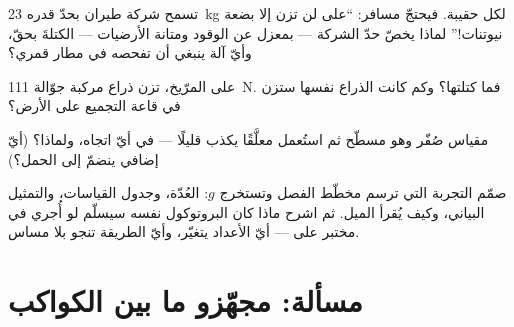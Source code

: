 \begin{exercise}[$\star\star$]\label{exo:g9:weight-vs-mass:9}
تسمح شركة طيران بحدّ قدره \qty{23}{kg} لكل حقيبة. فيحتجّ مسافر: ``على
 لن تزن إلا بضعة نيوتنات!'' لماذا يخصّ حدّ الشركة ---
بمعزل عن الوقود ومتانة الأرضيات --- الكتلةَ بحقّ، وأيّ آلة
ينبغي أن تفحصه في مطار قمري؟
\end{exercise}

\begin{exercise}[$\star\star$]\label{exo:g9:weight-vs-mass:10}
على المرّيخ، تزن ذراع مركبة جوّالة \qty{111}{N}. فما كتلتها؟
وكم كانت الذراع نفسها ستزن في قاعة التجميع على الأرض؟
\end{exercise}

\begin{exercise}[$\star\star$]\label{exo:g9:weight-vs-mass:11}
مقياس  صُفّر وهو مسطّح ثم استُعمل معلَّقًا يكذب قليلًا ---
في أيّ اتجاه، ولماذا؟ (أيّ  إضافي ينضمّ إلى  الحمل؟)
\end{exercise}

\begin{exercise}[$\star\star\star$]\label{exo:g9:weight-vs-mass:12}
صمّم التجربة التي ترسم مخطّط الفصل وتستخرج $g$: العُدّة، وجدول
القياسات، والتمثيل البياني، وكيف يُقرأ الميل. ثم اشرح ماذا كان
البروتوكول نفسه سيسلّم لو أُجري في مختبر على  --- أيّ
الأعداد يتغيّر، وأيّ الطريقة تنجو بلا مساس.
\end{exercise}

\section{مسألة: مجهّزو ما بين الكواكب}

